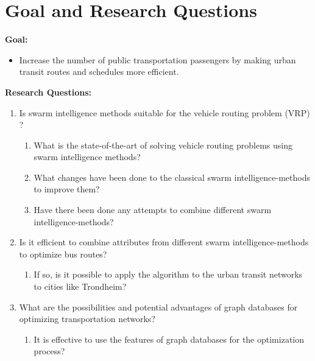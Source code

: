 \section{Goal and Research Questions}
\textbf{Goal:}
\begin{itemize}
\item \label{itm:goal} Increase the number of public transportation passengers by making urban transit routes and schedules more efficient.
\end{itemize}
\textbf{Research Questions:}
\begin{enumerate}
  \item Is swarm intelligence methods suitable for the vehicle routing problem (VRP) ?
    \begin{enumerate}
    \item What is the state-of-the-art of solving vehicle routing problems using swarm intelligence methods?
    \item What changes have been done to the classical swarm intelligence-methods to improve them?
    \item Have there been done any attempts to combine different swarm intelligence-methods?
  \end{enumerate}
 
\item Is it efficient to combine attributes from different swarm intelligence-methods to optimize bus routes?
    \begin{enumerate}
    \item If so, is it possible to apply the algorithm to the urban transit networks to cities like Trondheim?
  \end{enumerate}
\item What are the possibilities and potential advantages of graph databases for optimizing transportation networks?
\begin{enumerate}
\item It is effective to use the features of graph databases for the optimization process? 
\end{enumerate}
\end{enumerate}